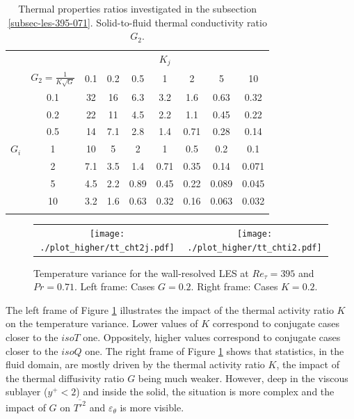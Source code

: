 \documentclass{svjour3}                     %
\begin{document}
\begin{table}
\centering
\caption{
Thermal properties ratios investigated in the subsection \ref{subsec-les-395-071}.
Solid-to-fluid thermal conductivity ratio $G_2$.}
\label{tab-higher-props}
\begin{tabular}{rc|ccccccc}
\hline \noalign{\smallskip}
      &      &     &     &      & $K_j$ &      &       &    \\
      & $G_2 = \frac{1}{K \sqrt{G}}$ & 0.1 & 0.2 & 0.5  & 1     & 2    & 5     & 10 \\ \noalign{\smallskip} \hline \noalign{\smallskip}
      & 0.1  & 32  & 16  & 6.3  & 3.2   & 1.6  & 0.63  & 0.32\\
      & 0.2  & 22  & 11  & 4.5  & 2.2   & 1.1  & 0.45  & 0.22\\
      & 0.5  & 14  & 7.1 & 2.8  & 1.4   & 0.71 & 0.28  & 0.14\\
$G_i$ & 1    & 10  & 5 & 2 & 1   & 0.5 & 0.2  & 0.1\\
      & 2    & 7.1 & 3.5 & 1.4  & 0.71  & 0.35 & 0.14  & 0.071\\
      & 5    & 4.5 & 2.2 & 0.89 & 0.45  & 0.22 & 0.089 & 0.045\\
      & 10   & 3.2 & 1.6 & 0.63 & 0.32  & 0.16 & 0.063 & 0.032\\
\noalign{\smallskip} \hline
\end{tabular}
\end{table}

\begin{figure}
\centering
\begin{tabular}{cc}
\texttt{[image: ./plot\_higher/tt\_cht2j.pdf]} &
\texttt{[image: ./plot\_higher/tt\_chti2.pdf]}
\end{tabular}
\caption{
Temperature variance for the wall-resolved LES at $Re_\tau = 395$ and $Pr = 0.71$.
Left frame: Cases $G=0.2$.
Right frame: Cases $K=0.2$.
}\label{fig-higher_395_tt}
\end{figure}

The left frame of Figure \ref{fig-higher_395_tt} illustrates the impact of the thermal activity ratio $K$ on the temperature variance.
Lower values of $K$ correspond to conjugate cases closer to the $isoT$ one.
Oppositely, higher values correspond to conjugate cases closer to the $isoQ$ one.
The right frame of Figure \ref{fig-higher_395_tt} shows that statistics, in the fluid domain, are mostly driven by the thermal activity ratio $K$, the impact of the thermal diffusivity ratio $G$ being much weaker.
However, deep in the viscous sublayer ($y^+ < 2$) and inside the solid, the situation is more complex and the impact of $G$ on $\overline{T'^2}$ and $\varepsilon_\theta$ is more visible.
\end{document}
